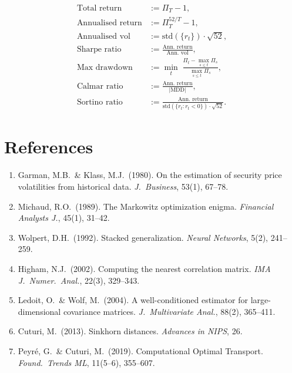 \documentclass[11pt]{article}
\begin{document}
\begin{align}
\text{Total return} &:= \Pi_T - 1,\\
\text{Annualised return} &:= \Pi_T^{52/T} - 1,\\
\text{Annualised vol} &:= \mathrm{std}(\{r_t\})\cdot\sqrt{52},\\
\text{Sharpe ratio} &:= \frac{\text{Ann.\ return}}{\text{Ann.\ vol}},\\
\text{Max drawdown} &:= \min_t\;\frac{\Pi_t - \max_{s\le t}\Pi_s}{\max_{s\le t}\Pi_s},\\
\text{Calmar ratio} &:= \frac{\text{Ann.\ return}}{|\text{MDD}|},\\
\text{Sortino ratio} &:= \frac{\text{Ann.\ return}}
  {\mathrm{std}(\{r_t:r_t<0\})\cdot\sqrt{52}}.
\end{align}

\newpage
\section*{References}

\begin{enumerate}
\item Garman, M.B.\ \& Klass, M.J.\ (1980). On the estimation of security price volatilities from historical data. \textit{J.\ Business}, 53(1), 67--78.
\item Michaud, R.O.\ (1989). The Markowitz optimization enigma. \textit{Financial Analysts J.}, 45(1), 31--42.
\item Wolpert, D.H.\ (1992). Stacked generalization. \textit{Neural Networks}, 5(2), 241--259.
\item Higham, N.J.\ (2002). Computing the nearest correlation matrix. \textit{IMA J.\ Numer.\ Anal.}, 22(3), 329--343.
\item Ledoit, O.\ \& Wolf, M.\ (2004). A well-conditioned estimator for large-dimensional covariance matrices. \textit{J.\ Multivariate Anal.}, 88(2), 365--411.
\item Cuturi, M.\ (2013). Sinkhorn distances. \textit{Advances in NIPS}, 26.
\item Peyr\'e, G.\ \& Cuturi, M.\ (2019). Computational Optimal Transport. \textit{Found.\ Trends ML}, 11(5--6), 355--607.
\end{enumerate}
\end{document}
